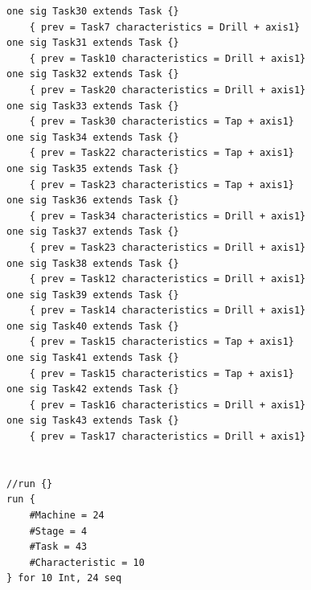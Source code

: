 \begin{lstlisting}
one sig Task30 extends Task {} 
	{ prev = Task7 characteristics = Drill + axis1}
one sig Task31 extends Task {} 
	{ prev = Task10 characteristics = Drill + axis1}
one sig Task32 extends Task {} 
	{ prev = Task20 characteristics = Drill + axis1}
one sig Task33 extends Task {} 
	{ prev = Task30 characteristics = Tap + axis1}
one sig Task34 extends Task {} 
	{ prev = Task22 characteristics = Tap + axis1}
one sig Task35 extends Task {} 
	{ prev = Task23 characteristics = Tap + axis1}
one sig Task36 extends Task {} 
	{ prev = Task34 characteristics = Drill + axis1}
one sig Task37 extends Task {} 
	{ prev = Task23 characteristics = Drill + axis1}
one sig Task38 extends Task {} 
	{ prev = Task12 characteristics = Drill + axis1}
one sig Task39 extends Task {} 
	{ prev = Task14 characteristics = Drill + axis1}
one sig Task40 extends Task {} 
	{ prev = Task15 characteristics = Tap + axis1}
one sig Task41 extends Task {} 
	{ prev = Task15 characteristics = Tap + axis1}
one sig Task42 extends Task {} 
	{ prev = Task16 characteristics = Drill + axis1}
one sig Task43 extends Task {} 
	{ prev = Task17 characteristics = Drill + axis1}


//run {}
run {
	#Machine = 24
	#Stage = 4
	#Task = 43
	#Characteristic = 10
} for 10 Int, 24 seq
\end{lstlisting}